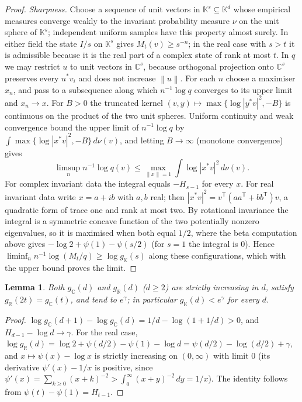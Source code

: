 \documentclass[11pt,a4paper]{article}
\newtheorem{lemma}[theorem]{Lemma}
\theoremstyle{remark}
\newcommand{\norm}[1]{\left\lVert#1\right\rVert}
\newcommand{\C}{\mathbb C}
\newcommand{\R}{\mathbb R}
\newcommand{\K}{\mathbb K}
\begin{document}
\begin{proof}
\emph{Sharpness.} Choose a sequence of unit vectors in $\K^s\subseteq\K^d$ whose empirical measures converge weakly to the invariant probability measure $\nu$ on the unit sphere of $\K^s$; independent uniform samples have this property almost surely. In either field the state $I/s$ on $\K^s$ gives $M_t(v)\ge s^{-n}$; in the real case with $s>t$ it is admissible because it is the real part of a complex state of rank at most $t$. In $q$ we may restrict $u$ to unit vectors in $\C^s$, because orthogonal projection onto $\C^s$ preserves every $u^*v_i$ and does not increase $\norm u$. For each $n$ choose a maximiser $x_n$, and pass to a subsequence along which $n^{-1}\log q$ converges to its upper limit and $x_n\to x$. For $B>0$ the truncated kernel $(v,y)\mapsto\max\{\log|y^*v|^2,-B\}$ is continuous on the product of the two unit spheres. Uniform continuity and weak convergence bound the upper limit of $n^{-1}\log q$ by $\int\max\{\log|x^*v|^2,-B\}\,d\nu(v)$, and letting $B\to\infty$ (monotone convergence) gives
\[
 \limsup_n n^{-1}\log q(v)\le \max_{\norm x=1}\int\log|x^*v|^2\,d\nu(v).
\]
For complex invariant data the integral equals $-H_{s-1}$ for every $x$. For real invariant data write $x=a+ib$ with $a,b$ real; then $|x^*v|^2=v^{\mathsf T}(aa^{\mathsf T}+bb^{\mathsf T})v$, a quadratic form of trace one and rank at most two. By rotational invariance the integral is a symmetric concave function of the two potentially nonzero eigenvalues, so it is maximised when both equal $1/2$, where the beta computation above gives $-\log2+\psi(1)-\psi(s/2)$ (for $s=1$ the integral is $0$). Hence $\liminf_n n^{-1}\log(M_t/q)\ge\log g_\K(s)$ along these configurations, which with the upper bound proves the limit.
\end{proof}

\begin{lemma}\label{lem:monotone}
Both $g_\C(d)$ and $g_\R(d)$ ($d\ge2$) are strictly increasing in $d$, satisfy $g_\R(2t)=g_\C(t)$, and tend to $e^\gamma$; in particular $g_\K(d)<e^\gamma$ for every $d$.
\end{lemma}
\begin{proof}
$\log g_\C(d+1)-\log g_\C(d)=1/d-\log(1+1/d)>0$, and $H_{d-1}-\log d\to\gamma$. For the real case, $\log g_\R(d)=\log 2+\psi(d/2)-\psi(1)-\log d=\psi(d/2)-\log(d/2)+\gamma$, and $x\mapsto\psi(x)-\log x$ is strictly increasing on $(0,\infty)$ with limit $0$ (its derivative $\psi'(x)-1/x$ is positive, since $\psi'(x)=\sum_{k\ge0}(x+k)^{-2}>\int_0^\infty(x+y)^{-2}\,dy=1/x$). The identity follows from $\psi(t)-\psi(1)=H_{t-1}$.
\end{proof}
\end{document}

